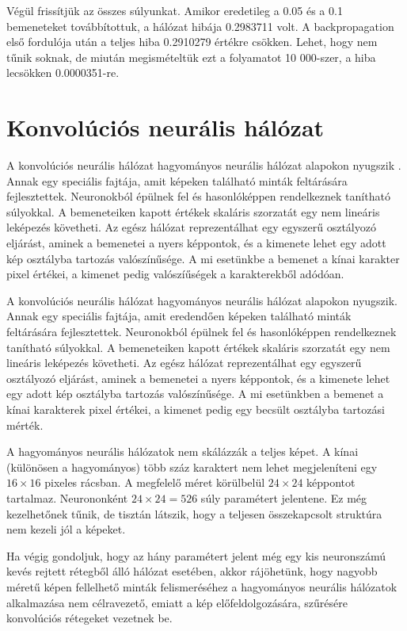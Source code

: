 Végül frissítjük az összes súlyunkat. Amikor eredetileg a 0.05 és a 0.1 bemeneteket továbbítottuk, a hálózat hibája 0.2983711 volt. A backpropagation első fordulója után a teljes hiba 0.2910279 értékre csökken. Lehet, hogy nem tűnik soknak, de miután megismételtük ezt a folyamatot 10 000-szer, a hiba lecsökken 0.0000351-re.

\section{Konvolúciós neurális hálózat}

A konvolúciós neurális hálózat hagyományos neurális hálózat alapokon nyugszik \cite{liconvolution}. Annak egy speciális fajtája, amit képeken található minták feltárására fejlesztettek. Neuronokból épülnek fel és hasonlóképpen rendelkeznek tanítható súlyokkal. A bemeneteiken kapott értékek skaláris szorzatát egy nem lineáris leképezés követheti. Az egész hálózat reprezentálhat egy egyszerű osztályozó eljárást, aminek a bemenetei a nyers képpontok, és a kimenete lehet egy adott kép osztályba tartozás valószínűsége. A mi esetünkbe a bemenet a kínai karakter pixel értékei, a kimenet pedig valószíűségek a karakterekből adódóan.

A konvolúciós neurális hálózat hagyományos neurális hálózat alapokon nyugszik. Annak egy speciális fajtája, amit eredendően képeken található minták feltárására fejlesztettek. Neuronokból épülnek fel és hasonlóképpen rendelkeznek tanítható súlyokkal. A bemeneteiken kapott értékek skaláris szorzatát egy nem lineáris leképezés követheti. Az egész hálózat reprezentálhat egy egyszerű osztályozó eljárást, aminek a bemenetei a nyers képpontok, és a kimenete lehet egy adott kép osztályba tartozás valószínűsége. A mi esetünkben a bemenet a kínai karakterek pixel értékei, a kimenet pedig egy becsült osztályba tartozási mérték.

A hagyományos neurális hálózatok nem skálázzák a teljes képet. A kínai (különösen a hagyományos) több száz karaktert nem lehet megjeleníteni egy $16 \times 16$ pixeles rácsban. A megfelelő méret körülbelül $24 \times 24$ képpontot tartalmaz. Neurononként $24 \times 24 = 526$ súly paramétert jelentene. Ez még kezelhetőnek tűnik, de tisztán látszik, hogy a teljesen összekapcsolt struktúra nem kezeli jól a képeket.

Ha végig gondoljuk, hogy az hány paramétert jelent még egy kis neuronszámú kevés rejtett rétegből álló hálózat esetében, akkor rájöhetünk, hogy nagyobb méretű képen fellelhető minták felismeréséhez a hagyományos neurális hálózatok alkalmazása nem célravezető, emiatt a kép előfeldolgozására, szűrésére konvolúciós rétegeket vezetnek be.

